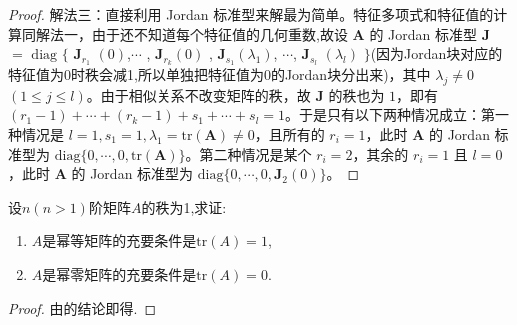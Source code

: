 \documentclass[../../main.tex]{subfiles}%
\begin{document}
\begin{proof}
{\color{blue}解法三：}直接利用 Jordan 标准型来解最为简单。特征多项式和特征值的计算同解法一，由于还不知道每个特征值的几何重数,故设 \(\boldsymbol{A}\) 的 Jordan 标准型 $\boldsymbol{J}$  $=$ $\mathrm{diag}$ $\{$ $\boldsymbol{J}_{r_1}$ $(0)$,$ \cdots$ , $\boldsymbol{J}_{r_k}(0)$ , $\boldsymbol{J}_{s_1}(\lambda_1)$, $\cdots$, $\boldsymbol{J}_{s_l}$ $(\lambda_l)$ $\}$(因为Jordan块对应的特征值为0时秩会减1,所以单独把特征值为0的Jordan块分出来)，其中 \(\lambda_j \neq 0\) \((1 \leqslant  j \leqslant  l)\)。由于相似关系不改变矩阵的秩，故 \(\boldsymbol{J}\) 的秩也为 \(1\)，即有 \((r_1 - 1) + \cdots + (r_k - 1) + s_1 + \cdots + s_l = 1\)。于是只有以下两种情况成立：第一种情况是 \(l = 1, s_1 = 1, \lambda_1 = \mathrm{tr}(\boldsymbol{A}) \neq 0\)，且所有的 \(r_i = 1\)，此时 \(\boldsymbol{A}\) 的 Jordan 标准型为 \(\mathrm{diag}\{0, \cdots, 0, \mathrm{tr}(\boldsymbol{A})\}\)。第二种情况是某个 \(r_i = 2\)，其余的 \(r_i = 1\) 且 \(l = 0\)，此时 \(\boldsymbol{A}\) 的 Jordan 标准型为 \(\mathrm{diag}\{0, \cdots, 0, \boldsymbol{J}_2(0)\}\)。

\end{proof}

\begin{proposition}\label{proposition:幂等阵和幂零阵关于迹的充要条件}
设$n(n>1)$阶矩阵$A$的秩为1,求证:
\begin{enumerate}[(1)]
\item $A$是幂等矩阵的充要条件是$\mathrm{tr}\left( A \right) =1$,


\item $A$是幂零矩阵的充要条件是$\mathrm{tr}\left( A \right) =0$.
\end{enumerate}
\end{proposition}
\begin{proof}

由的结论即得.

\end{proof}
\end{document}
